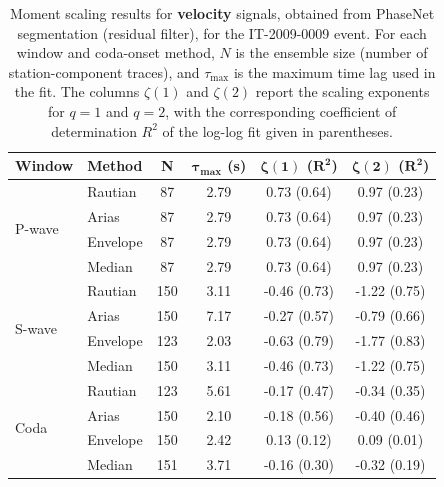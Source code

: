 \begin{table}[H]
\centering
\small
\begin{tabular}{llcccc}
\toprule
\textbf{Window} & \textbf{Method} & \textbf{N} & $\bm{\tau_{\max}}$ \textbf{(s)} & $\bm{\zeta(1)}$ \textbf{(}$\bm{R^2}$\textbf{)} & $\bm{\zeta(2)}$ \textbf{(}$\bm{R^2}$\textbf{)} \\
\midrule
\multirow{4}{*}{P-wave}
& Rautian & 87 & 2.79 & 0.73 (0.64) & 0.97 (0.23) \\
& Arias & 87 & 2.79 & 0.73 (0.64) & 0.97 (0.23) \\
& Envelope & 87 & 2.79 & 0.73 (0.64) & 0.97 (0.23) \\
& Median & 87 & 2.79 & 0.73 (0.64) & 0.97 (0.23) \\
\midrule
\multirow{4}{*}{S-wave}
& Rautian & 150 & 3.11 & -0.46 (0.73) & -1.22 (0.75) \\
& Arias & 150 & 7.17 & -0.27 (0.57) & -0.79 (0.66) \\
& Envelope & 123 & 2.03 & -0.63 (0.79) & -1.77 (0.83) \\
& Median & 150 & 3.11 & -0.46 (0.73) & -1.22 (0.75) \\
\midrule
\multirow{4}{*}{Coda}
& Rautian & 123 & 5.61 & -0.17 (0.47) & -0.34 (0.35) \\
& Arias & 150 & 2.10 & -0.18 (0.56) & -0.40 (0.46) \\
& Envelope & 150 & 2.42 & 0.13 (0.12) & 0.09 (0.01) \\
& Median & 151 & 3.71 & -0.16 (0.30) & -0.32 (0.19) \\
\bottomrule
\end{tabular}
\caption{Moment scaling results for \textbf{velocity} signals, obtained from PhaseNet segmentation (residual filter), for the IT-2009-0009 event. For each window and coda-onset method, $N$ is the ensemble size (number of station-component traces), and $\tau_{\max}$ is the maximum time lag used in the fit. The columns $\zeta(1)$ and $\zeta(2)$ report the scaling exponents for $q=1$ and $q=2$, with the corresponding coefficient of determination $R^2$ of the log-log fit given in parentheses.}
\label{tab:phasenet_scaling_vel_res_filter_laquila}
\end{table}